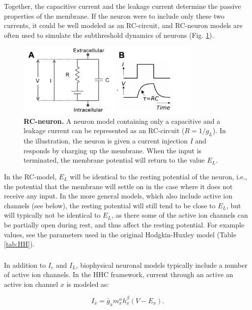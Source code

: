 Together, the capacitive current and the leakage current determine the passive properties of the membrane. If the neuron were to include only these two currents, it could be well modeled as an RC-circuit, and RC-neuron models are often used to simulate the subthreshold dynamics of neurons (Fig. \ref{Neuron:fig:RC}). 

\begin{figure}[!ht]
\begin{center}
\includegraphics[width=0.8\textwidth]{Figures/Neuron/RCneuron.png}
\end{center}
\caption{\textbf{RC-neuron.}  A neuron model containing only a capacitive and a leakage current can be represented as an RC-circuit ($R = 1/g_L$). In the illustration, the neuron is given a current injection $I$ and responds by charging up the membrane. When the input is terminated, the membrane potential will return to the value $E_L$.
}
\label{Neuron:fig:RC}
\end{figure}

In the RC-model, $E_L$ will be identical to the resting potential of the neuron, i.e., the potential that the membrane will settle on in the case where it does not receive any input. In the more general models, which also include active ion channels (see below), the resting potential will still tend to be close to $E_L$, but will typically not be identical to $E_L$, as there some of the active ion channels can be partially open during rest, and thus affect the resting potential. For example values, see the parameters used in the original Hodgkin-Huxley model (Table \ref{tab:HH}).

\subsubsection{}
In addition to $I_c$ and $I_L$, biophysical neuronal models typically include a number of active ion channels. In the HHC framework, current through an active an active ion channel $x$ is modeled as:

\begin{equation}
I_x = \bar{g}_x m_x^{\alpha} h_x^{\beta}(V-E_x).
\label{eq:HHform}
\end{equation}

